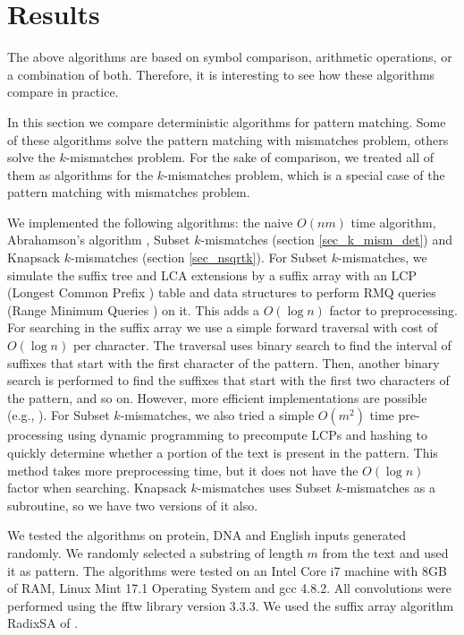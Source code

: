  

\section{Results}

The above algorithms are based on symbol comparison,
arithmetic operations, or a combination of both. Therefore, it is
interesting to see how these algorithms compare in practice.

In this section we compare deterministic algorithms for pattern matching.
Some of these algorithms solve the pattern matching with mismatches problem, others solve the $k$-mismatches problem. For the sake
of comparison, we treated all of them as algorithms for the $k$-mismatches
problem, which is a special case of the pattern matching with mismatches problem. 

We implemented the following algorithms:
the naive $O(nm)$ time algorithm, Abrahamson's algorithm \cite{ABR87}, Subset
$k$-mismatches (section \ref{sec_k_mism_det}) and Knapsack $k$-mismatches
(section \ref{sec_nsqrtk}). 
For Subset $k$-mismatches, we simulate
the suffix tree and LCA extensions by a suffix array with an LCP (Longest Common Prefix \cite{KLA+01})
table and data structures to perform RMQ queries (Range
Minimum Queries \cite{BFC00}) on it. This adds a $O(\log n)$ factor to
preprocessing. For searching in the suffix array we use a simple
forward traversal with cost of $O(\log n)$ per character.
The traversal uses binary search to find the
interval of suffixes that start with the first character of the pattern.
Then, another binary search is performed to find
the suffixes that start with the first two characters of the pattern, and so on.
However, more
efficient implementations are possible (e.g., \cite{FM00}).
For Subset $k$-mismatches, we also tried a simple $O(m^2)$ time pre-processing
using dynamic programming to precompute LCPs and hashing to quickly
determine whether a portion of the text is present in the pattern. 
This method takes more preprocessing time, but it does not have the
$O(\log n)$ factor when searching. Knapsack $k$-mismatches uses Subset
$k$-mismatches as a subroutine, so we have two versions of it also.

We tested the algorithms on protein, DNA and English inputs generated
randomly. We randomly selected a substring of
length $m$ from the text and used it as pattern. The algorithms were tested on
an Intel Core i7 machine with 8GB of RAM, Linux Mint 17.1
Operating System and gcc 4.8.2. All convolutions were performed using the
fftw \cite{FFTW05} library version 3.3.3. We used the suffix array
algorithm RadixSA of \cite{RNSA14}.

